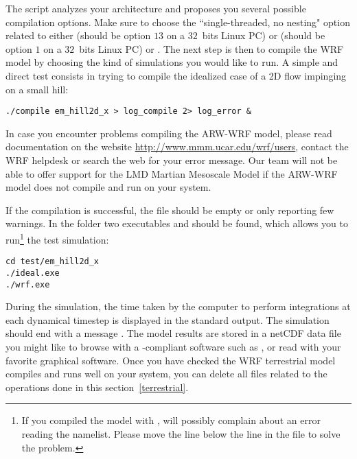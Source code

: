 \sk
The  script analyzes your architecture and proposes you several possible compilation options. Make sure to choose the ``single-threaded, no nesting" option related to either  (should be option $13$ on a $32$~bits Linux PC) or  (should be option $1$ on a $32$~bits Linux PC) or . The next step is then to compile the WRF model by choosing the kind of simulations you would like to run. A simple and direct test consists in trying to compile the idealized case of a 2D flow impinging on a small hill:
\begin{verbatim}
./compile em_hill2d_x > log_compile 2> log_error &
\end{verbatim}
%
\begin{finger} \item In case you encounter problems compiling the ARW-WRF model, please read documentation on the website \url{http://www.mmm.ucar.edu/wrf/users}, contact the WRF helpdesk or search the web for your error message. Our team will not be able to offer support for the LMD Martian Mesoscale Model if the ARW-WRF model does not compile and run on your system. \end{finger}

\sk
If the compilation is successful, the file  should be empty or only reporting few warnings. In the  folder two executables  and  should be found, which allows you to run\footnote{If you compiled the model with ,  will possibly complain about an error reading the namelist. Please move the line  below the line  in the  file to solve the problem.} the test simulation:
\begin{verbatim}
cd test/em_hill2d_x
./ideal.exe
./wrf.exe
\end{verbatim}

\sk
During the simulation, the time taken by the computer to perform integrations at each dynamical timestep  is displayed in the standard output. The simulation should end with a message . The model results are stored in a  netCDF data file you might like to browse with a -compliant software such as , or read with your favorite graphical software. Once you have checked the WRF terrestrial model compiles and runs well on your system, you can delete all files related to the operations done in this section~\ref{terrestrial}.


